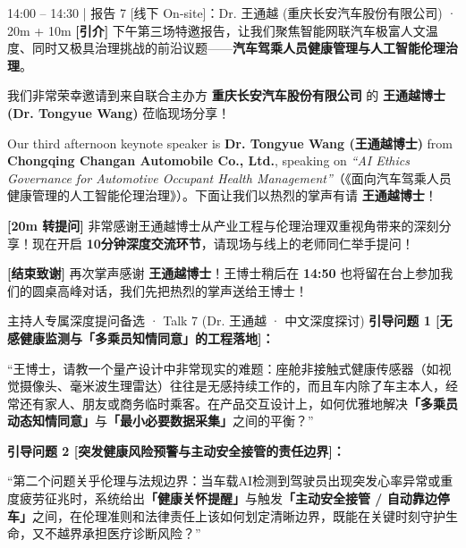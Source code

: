 \documentclass[12pt,a4paper]{article}
\begin{document}
\begin{scriptbox}{14:00 – 14:30 \;|\; 报告 7 [线下 On-site]：Dr. 王通越 (重庆长安汽车股份有限公司) · 20m + 10m}
\fontsize{11.8}{17.4}\selectfont
\textbf{[引介]} 下午第三场特邀报告，让我们聚焦智能网联汽车极富人文温度、同时又极具治理挑战的前沿议题——\textbf{汽车驾乘人员健康管理与人工智能伦理治理}。\par
我们非常荣幸邀请到来自联合主办方 \textbf{重庆长安汽车股份有限公司} 的 \textbf{王通越博士 (Dr. Tongyue Wang)} 莅临现场分享！\par
Our third afternoon keynote speaker is \textbf{Dr. Tongyue Wang (王通越博士)} from \textbf{Chongqing Changan Automobile Co., Ltd.}, speaking on \textit{``AI Ethics Governance for Automotive Occupant Health Management''}（《面向汽车驾乘人员健康管理的人工智能伦理治理》）。下面让我们以热烈的掌声有请 \textbf{王通越博士}！\par
\vspace{1.2mm}
\textbf{[20m 转提问]} 非常感谢王通越博士从产业工程与伦理治理双重视角带来的深刻分享！现在开启 \textbf{10分钟深度交流环节}，请现场与线上的老师同仁举手提问！\par
\vspace{1mm}
\textbf{[结束致谢]} 再次掌声感谢 \textbf{王通越博士}！王博士稍后在 \textbf{14:50} 也将留在台上参加我们的圆桌高峰对话，我们先把热烈的掌声送给王博士！
\end{scriptbox}

\begin{qabox}{主持人专属深度提问备选 · Talk 7 (Dr. 王通越 · 中文深度探讨)}
\fontsize{11.2}{16.6}\selectfont
\textbf{引导问题 1 [无感健康监测与「多乘员知情同意」的工程落地]：}\par
“王博士，请教一个量产设计中非常现实的难题：座舱非接触式健康传感器（如视觉摄像头、毫米波生理雷达）往往是无感持续工作的，而且车内除了车主本人，经常还有家人、朋友或商务临时乘客。在产品交互设计上，如何优雅地解决\textbf{「多乘员动态知情同意」}与\textbf{「最小必要数据采集」}之间的平衡？”\par
\vspace{1.8mm}
\textbf{引导问题 2 [突发健康风险预警与主动安全接管的责任边界]：}\par
“第二个问题关乎伦理与法规边界：当车载AI检测到驾驶员出现突发心率异常或重度疲劳征兆时，系统给出\textbf{「健康关怀提醒」}与触发\textbf{「主动安全接管 / 自动靠边停车」}之间，在伦理准则和法律责任上该如何划定清晰边界，既能在关键时刻守护生命，又不越界承担医疗诊断风险？”
\end{qabox}
\end{document}
